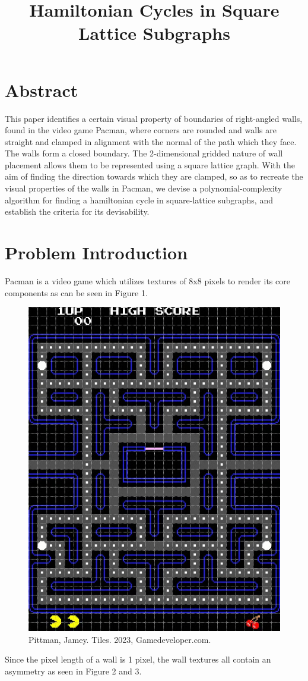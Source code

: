 \documentclass{article}
\title{Hamiltonian Cycles in Square Lattice Subgraphs}
\begin{document}
\date{\vspace{-5ex}}
\maketitle

\section{Abstract}
This paper identifies a certain visual property of boundaries of right-angled walls, found in the video game Pacman, where corners are rounded and walls are straight and clamped in alignment with the normal of the path which they face. The walls form a closed boundary. The 2-dimensional gridded nature of wall placement allows them to be represented using a square lattice graph. With the aim of finding the direction towards which they are clamped, so as to recreate the visual properties of the walls in Pacman, we devise a polynomial-complexity algorithm for finding a hamiltonian cycle in square-lattice subgraphs, and establish the criteria for its devisability.

\section{Problem Introduction}
Pacman is a video game which utilizes textures of 8x8 pixels to render its core components as can be seen in Figure 1. 

\begin{figure}[H]
\centering
\includegraphics[width=0.4\linewidth]{Image-1.jpg}
\caption [Pacman level divided into squares of 8x8 pixels.]{Pittman, Jamey. Tiles. 2023, Gamedeveloper.com.}
\label{Pacman Level Grid}
\end{figure}

Since the pixel length of a wall is 1 pixel, the wall textures all contain an asymmetry as seen in Figure 2 and 3.
\end{document}
